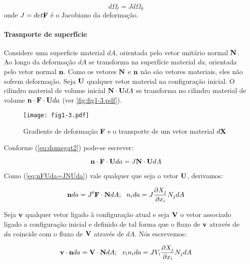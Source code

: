 \documentclass[
	11pt, %
	fleqn, %
	a4paper, %
]{LegrandOrangeBook}
\begin{document}
\begin{equation}
	\label{eq:domegat2}	
	d\Omega_t = Jd\Omega_0
\end{equation}
onde $J=det{\textbf{F}}$ é o Jacobiano da deformação.

\paragraph{Trasnporte de superfície} Considere uma superficie material $dA$, orientada pelo vetor unitário normal $\textbf{N}$. Ao longo da deformação $dA$ se transforma na superfície material $da$, orientada pelo vetor normal $\textbf{n}$. Como os vetores $\textbf{N}$ e $\textbf{n}$ não são vetores materiais, eles não sofrem deformação. Seja $\textbf{U}$ qualquer vetor material na configuração inicial. O cilindro material de volume inicial $\textbf{N} \cdot \textbf{U} dA$ se transforma no cilindro material de volume $\textbf{n} \cdot \textbf{F} \cdot \textbf{U} da$ (ver \autoref{fig:fig1-3.pdf}). 

\begin{figure}[H] %
	\centering %
	\texttt{[image: fig1-3.pdf]} %
	\caption{Gradiente de deformação $\textbf{F}$ e o transporte de um vetor material $d\textbf{X}$}
	\label{fig:fig1-3.pdf} %
\end{figure}


Conforme (\ref{eq:domegat2}) pode-se escrever:

\begin{equation}
	\label{eq:nFUda=JNUda}	
	\textbf{n} \cdot \textbf{F} \cdot \textbf{U} da = J \textbf{N} \cdot \textbf{U} dA
\end{equation}

Como (\ref{eq:nFUda=JNUda}) vale qualquer que seja o vetor $\textbf{U}$, derivamos:

\begin{equation}
	\label{eq:nda=JFNdA}	
	\textbf{n} da = J {}^t\textbf{F} \cdot \textbf{N} dA; ~~ n_ida = J \dfrac{\partial X_j}{\partial x_i}N_jdA
\end{equation}

Seja $\textbf{v}$ qualquer vetor ligado à configuração atual e seja $\textbf{V}$ o vetor associado ligado a configuração inicial e definido de tal forma que o fluxo de $\textbf{v}$ através de $da$ coincide com o fluxo de $\textbf{V}$ através de $dA$. Nós escrevemos:

\begin{equation}
	\label{eq:vnda=VNdA}	
	\textbf{v} \cdot \textbf{n} da = \textbf{V} \cdot \textbf{N} dA;~~ v_in_ida = JV_i\dfrac{\partial X_j}{\partial x_i}N_jdA
\end{equation}
\end{document}
